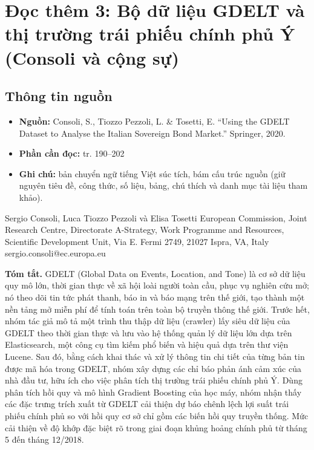 \chapter{Đọc thêm 3: Bộ dữ liệu GDELT và thị trường trái phiếu chính phủ Ý (Consoli và cộng sự)}
\label{ch:M5L3DocThem3}

\section{Thông tin nguồn}

\begin{itemize}
  \item \textbf{Nguồn:} Consoli, S., Tiozzo Pezzoli, L. \& Tosetti, E. ``Using the GDELT Dataset to Analyse the Italian Sovereign Bond Market.'' Springer, 2020.
  \item \textbf{Phần cần đọc:} tr. 190--202
  \item \textbf{Ghi chú:} bản chuyển ngữ tiếng Việt súc tích, bám cấu trúc nguồn (giữ nguyên tiêu đề, công thức, số liệu, bảng, chú thích và danh mục tài liệu tham khảo).
\end{itemize}

Sergio Consoli, Luca Tiozzo Pezzoli và Elisa Tosetti European Commission, Joint Research Centre, Directorate A-Strategy, Work Programme and Resources, Scientific Development Unit, Via E. Fermi 2749, 21027 Ispra, VA, Italy sergio.consoli@ec.europa.eu

\textbf{Tóm tắt.} GDELT (Global Data on Events, Location, and Tone) là cơ sở dữ liệu quy mô lớn, thời gian thực về xã hội loài người toàn cầu, phục vụ nghiên cứu mở; nó theo dõi tin tức phát thanh, báo in và báo mạng trên thế giới, tạo thành một nền tảng mở miễn phí để tính toán trên toàn bộ truyền thông thế giới. Trước hết, nhóm tác giả mô tả một trình thu thập dữ liệu (crawler) lấy siêu dữ liệu của GDELT theo thời gian thực và lưu vào hệ thống quản lý dữ liệu lớn dựa trên Elasticsearch, một công cụ tìm kiếm phổ biến và hiệu quả dựa trên thư viện Lucene. Sau đó, bằng cách khai thác và xử lý thông tin chi tiết của từng bản tin được mã hóa trong GDELT, nhóm xây dựng các chỉ báo phản ánh cảm xúc của nhà đầu tư, hữu ích cho việc phân tích thị trường trái phiếu chính phủ Ý. Dùng phân tích hồi quy và mô hình Gradient Boosting của học máy, nhóm nhận thấy các đặc trưng trích xuất từ GDELT cải thiện dự báo chênh lệch lợi suất trái phiếu chính phủ so với hồi quy cơ sở chỉ gồm các biến hồi quy truyền thống. Mức cải thiện về độ khớp đặc biệt rõ trong giai đoạn khủng hoảng chính phủ từ tháng 5 đến tháng 12/2018.


